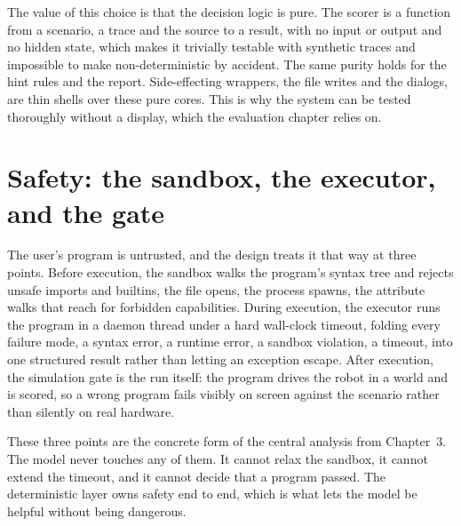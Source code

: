 \documentclass[11pt,a4paper]{report}
\begin{document}
The value of this choice is that the decision logic is pure. The scorer is a function from a scenario, a trace and the source to a result, with no input or output and no hidden state, which makes it trivially testable with synthetic traces and impossible to make non-deterministic by accident. The same purity holds for the hint rules and the report. Side-effecting wrappers, the file writes and the dialogs, are thin shells over these pure cores. This is why the system can be tested thoroughly without a display, which the evaluation chapter relies on.

\section{Safety: the sandbox, the executor, and the gate}
\label{sec:safety}
The user's program is untrusted, and the design treats it that way at three points. Before execution, the sandbox walks the program's syntax tree and rejects unsafe imports and builtins, the file opens, the process spawns, the attribute walks that reach for forbidden capabilities. During execution, the executor runs the program in a daemon thread under a hard wall-clock timeout, folding every failure mode, a syntax error, a runtime error, a sandbox violation, a timeout, into one structured result rather than letting an exception escape. After execution, the simulation gate is the run itself: the program drives the robot in a world and is scored, so a wrong program fails visibly on screen against the scenario rather than silently on real hardware.

These three points are the concrete form of the central analysis from Chapter~3. The model never touches any of them. It cannot relax the sandbox, it cannot extend the timeout, and it cannot decide that a program passed. The deterministic layer owns safety end to end, which is what lets the model be helpful without being dangerous.
\end{document}
